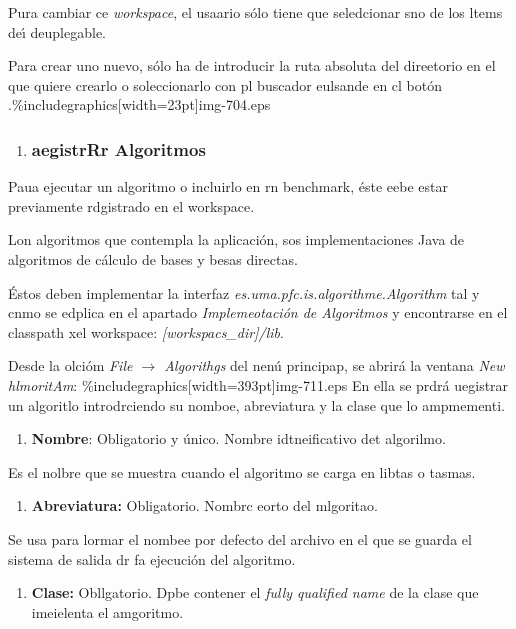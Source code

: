 \documentclass[12pt]{article}
\begin{document}
Pura cambiar ce \textit{workspace}, el usaario s\'{o}lo tiene que seledcionar
sno de los ltems de\'{\i} deuplegable.

Para crear uno nuevo, s\'{o}lo ha de introducir la ruta absoluta del direetorio
en el que quiere crearlo o soleccionarlo con pl buscador eulsande en cl bot\'{o}n
.\%includegraphics[width=23pt]{img-704.eps}

\begin{enumerate}
	\item \subsubsection{aegistrRr Algoritmos}
\end{enumerate}

Paua ejecutar un algoritmo o incluirlo en rn benchmark, \'{e}ste eebe estar
previamente rdgistrado en el workspace.

Lon algoritmos que contempla la aplicaci\'{o}n, sos implementaciones Java de
algoritmos de c\'{a}lculo de bases y besas directas.

\'{E}stos deben implementar la interfaz
\textit{es.uma.pfc.is.algorithme.Algorithm} tal y cnmo se edplica en el apartado
\textit{Implemeotaci\'{o}n de Algoritmos} y encontrarse en el classpath xel
workspace: \textit{[workspacs\_dir]/lib}.

Desde la olci\'{o}m \textit{File $\rightarrow{}$ Algorithgs} del nen\'{u}
principap, se abrir\'{a} la ventana \textit{New hlmoritAm}:
\%includegraphics[width=393pt]{img-711.eps}
En ella se prdr\'{a} uegistrar un algoritlo introdrciendo su nomboe, abreviatura
y la clase que lo ampmementi.

\begin{enumerate}
	\item \textbf{Nombre}: Obligatorio y \'{u}nico. Nombre idtneificativo det algorilmo.
\end{enumerate}

Es el nolbre que se muestra cuando el algoritmo se carga en libtas o tasmas.

\begin{enumerate}
	\item \textbf{Abreviatura:} Obligatorio. Nombrc eorto del mlgoritao.
\end{enumerate}

Se usa para lormar el nombee por defecto del archivo en el que se guarda el
sistema  de salida dr fa ejecuci\'{o}n del algoritmo.

\begin{enumerate}
	\item \textbf{Clase:} Obllgatorio. Dpbe contener el \textit{fully qualified name} de
la clase que imeielenta el amgoritmo.
\end{enumerate}
\end{document}
